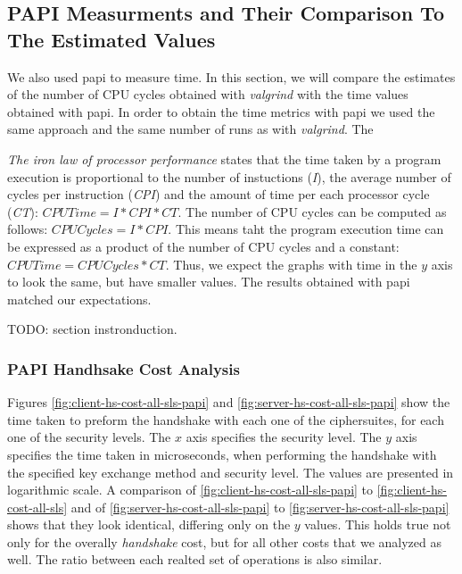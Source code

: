 \documentclass{llncs}
\begin{document}
\subsection{PAPI Measurments and Their Comparison To The Estimated Values}

We also used \gls{papi} to measure time. In this section, we will compare the estimates of the number of CPU cycles
obtained with \textit{valgrind} with the time values obtained with \gls{papi}. In order to obtain the time metrics with
\gls{papi} we used the same approach and the same number of runs as with \textit{valgrind}. The 

\textit{The iron law of processor performance}\cite{yadin2016computer} states that the time
taken by a program execution is proportional to the number of instuctions (\textit{I}), 
the average number of cycles per instruction (\textit{CPI}) and the amount of time per each processor
cycle (\textit{CT}): $CPU Time = I * CPI * CT$. The number of CPU cycles can be computed as 
follows: $CPU Cycles = I * CPI$. This means taht the program execution time can be expressed 
as a product of the number of CPU cycles and a constant: $CPU Time = CPU Cycles * CT$.
Thus, we expect the graphs with time in the $y$ axis to look the same, but have smaller
values. The results obtained with \gls{papi} matched our expectations.

TODO: section instronduction.

\subsubsection{PAPI Handhsake Cost Analysis}

Figures \ref{fig:client-hs-cost-all-sls-papi} and \ref{fig:server-hs-cost-all-sls-papi} show the time taken to preform the handshake with each one
of the ciphersuites, for each one of the security levels. The $x$ axis specifies the security level. The $y$ axis specifies the time taken in microseconds,
when performing the handshake with the specified key exchange method and security level. The values are presented in logarithmic scale. A comparison of
\ref{fig:client-hs-cost-all-sls-papi} to \ref{fig:client-hs-cost-all-sls} and of \ref{fig:server-hs-cost-all-sls-papi} to \ref{fig:server-hs-cost-all-sls-papi} shows that they look identical,
differing only on the $y$ values. This holds true not only for the overally \textit{handshake} cost, but for all other costs that we analyzed as well. The ratio between
each realted set of operations is also similar.
\end{document}
